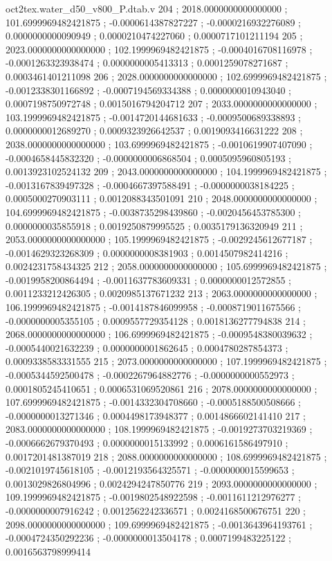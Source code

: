 \begin{filecontents}[overwrite]{oct2tex.water_d50_v800_P.dtab.v}
204 ; 2018.0000000000000000 ; 101.6999969482421875 ; -0.0000614387827227 ; -0.0000216932276089 ; 0.0000000000090949 ; 0.0000210474227060 ; 0.0000717101211194
205 ; 2023.0000000000000000 ; 102.1999969482421875 ; -0.0004016708116978 ; -0.0001263323938474 ; 0.0000000005413313 ; 0.0001259078271687 ; 0.0003461401211098
206 ; 2028.0000000000000000 ; 102.6999969482421875 ; -0.0012338301166892 ; -0.0007194569334388 ; 0.0000000010943040 ; 0.0007198750972748 ; 0.0015016794204712
207 ; 2033.0000000000000000 ; 103.1999969482421875 ; -0.0014720144681633 ; -0.0009500689338893 ; 0.0000000012689270 ; 0.0009323926642537 ; 0.0019093416631222
208 ; 2038.0000000000000000 ; 103.6999969482421875 ; -0.0010619907407090 ; -0.0004658445832320 ; -0.0000000006868504 ; 0.0005095960805193 ; 0.0013923102524132
209 ; 2043.0000000000000000 ; 104.1999969482421875 ; -0.0013167839497328 ; -0.0004667397588491 ; -0.0000000038184225 ; 0.0005000270903111 ; 0.0012088343501091
210 ; 2048.0000000000000000 ; 104.6999969482421875 ; -0.0038735298439860 ; -0.0020456453785300 ; 0.0000000035855918 ; 0.0019250879995525 ; 0.0035179136320949
211 ; 2053.0000000000000000 ; 105.1999969482421875 ; -0.0029245612677187 ; -0.0014629323268309 ; 0.0000000008381903 ; 0.0014507982414216 ; 0.0024231758434325
212 ; 2058.0000000000000000 ; 105.6999969482421875 ; -0.0019958200864494 ; -0.0011637783609331 ; 0.0000000012572855 ; 0.0011233212426305 ; 0.0020985137671232
213 ; 2063.0000000000000000 ; 106.1999969482421875 ; -0.0014187846099958 ; -0.0008719011675566 ; -0.0000000005355105 ; 0.0009557729354128 ; 0.0018136277794838
214 ; 2068.0000000000000000 ; 106.6999969482421875 ; -0.0009548380039632 ; -0.0005440021632239 ; 0.0000000001862645 ; 0.0004780287854373 ; 0.0009338583331555
215 ; 2073.0000000000000000 ; 107.1999969482421875 ; -0.0005344592500478 ; -0.0002267964882776 ; -0.0000000000552973 ; 0.0001805245410651 ; 0.0006531069520861
216 ; 2078.0000000000000000 ; 107.6999969482421875 ; -0.0014332304708660 ; -0.0005188500508666 ; -0.0000000013271346 ; 0.0004498173948377 ; 0.0014866602141410
217 ; 2083.0000000000000000 ; 108.1999969482421875 ; -0.0019273703219369 ; -0.0006662679370493 ; 0.0000000015133992 ; 0.0006161586497910 ; 0.0017201481387019
218 ; 2088.0000000000000000 ; 108.6999969482421875 ; -0.0021019745618105 ; -0.0012193564325571 ; -0.0000000015599653 ; 0.0013029826804996 ; 0.0024294247850776
219 ; 2093.0000000000000000 ; 109.1999969482421875 ; -0.0019802548922598 ; -0.0011611212976277 ; -0.0000000007916242 ; 0.0012562242336571 ; 0.0024168500676751
220 ; 2098.0000000000000000 ; 109.6999969482421875 ; -0.0013643964193761 ; -0.0004724350292236 ; -0.0000000013504178 ; 0.0007199483225122 ; 0.0016563798999414

\end{filecontents}
